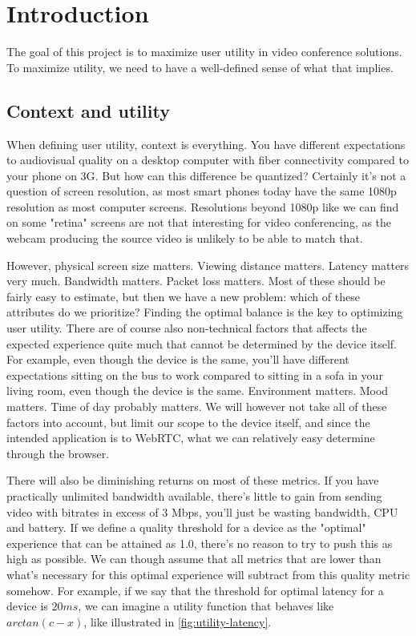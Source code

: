 \chapter{Introduction}\label{chp:introduction}


The goal of this project is to maximize user utility in video conference solutions. To maximize utility, we need to have a well-defined sense of what that implies.

\section{Context and utility}

When defining user utility, context is everything. You have different expectations to audiovisual quality on a desktop computer with fiber connectivity compared to your phone on 3G. But how can this difference be quantized? Certainly it's not a question of screen resolution, as most smart phones today have the same 1080p resolution as most computer screens. Resolutions beyond 1080p like we can find on some "retina" screens are not that interesting for video conferencing, as the webcam producing the source video is unlikely to be able to match that.

However, physical screen size matters. Viewing distance matters. Latency matters very much. Bandwidth matters. Packet loss matters. Most of these should be fairly easy to estimate, but then we have a new problem: which of these attributes do we prioritize? Finding the optimal balance is the key to optimizing user utility. There are of course also non-technical factors that affects the expected experience quite much that cannot be determined by the device itself. For example, even though the device is the same, you'll have different expectations sitting on the bus to work compared to sitting in a sofa in your living room, even though the device is the same. Environment matters. Mood matters. Time of day probably matters. We will however not take all of these factors into account, but limit our scope to the device itself, and since the intended application is to WebRTC, what we can relatively easy determine through the browser.

There will also be diminishing returns on most of these metrics. If you have practically unlimited bandwidth available, there's little to gain from sending video with bitrates in excess of 3 Mbps, you'll just be wasting bandwidth, CPU and battery. If we define a quality threshold for a device as the "optimal" experience that can be attained as 1.0, there's no reason to try to push this as high as possible. We can though assume that all metrics that are lower than what's necessary for this optimal experience will subtract from this quality metric somehow. For example, if we say that the threshold for optimal latency for a device is \(20ms\), we can imagine a \gls{utility function} that behaves like \(arctan(c-x)\), like illustrated in \autoref{fig:utility-latency}.


